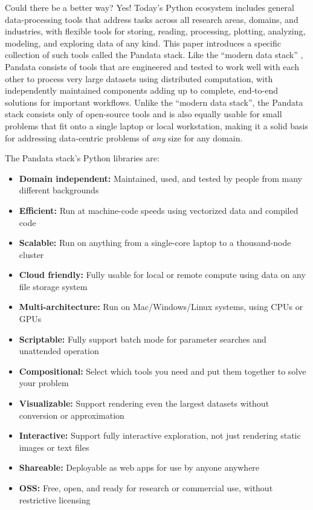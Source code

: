 Could there be a better way? Yes! Today's Python ecosystem includes general data-processing tools that address tasks across all research areas, domains, and industries, with flexible tools for storing, reading, processing, plotting, analyzing, modeling, and exploring data of any kind. This paper introduces a specific collection of such tools called the Pandata stack. Like the ``modern data stack'' \cite{handy:dbtb20,jaipuria:substack22}, Pandata consists of tools that are engineered and tested to work well with each other to process very large datasets using distributed computation, with independently maintained components adding up to complete, end-to-end solutions for important workflows. Unlike the ``modern data stack'', the Pandata stack consists only of open-source tools and is also equally usable for small problems that fit onto a single laptop or local workstation, making it a solid basis for addressing data-centric problems of \emph{any} size for any domain.

The Pandata stack's Python libraries are:

\begin{itemize}
  \item\textbf{Domain independent:} Maintained, used, and tested by people from many different backgrounds
  \item\textbf{Efficient:} Run at machine-code speeds using vectorized data and compiled code
  \item\textbf{Scalable:} Run on anything from a single-core laptop to a thousand-node cluster
  \item\textbf{Cloud friendly:} Fully usable for local or remote compute using data on any file storage system
  \item\textbf{Multi-architecture:} Run on Mac/Windows/Linux systems, using CPUs or GPUs
  \item\textbf{Scriptable:} Fully support batch mode for parameter searches and unattended operation
  \item\textbf{Compositional:} Select which tools you need and put them together to solve your problem
  \item\textbf{Visualizable:} Support rendering even the largest datasets without conversion or approximation
  \item\textbf{Interactive:} Support fully interactive exploration, not just rendering static images or text files
  \item\textbf{Shareable:} Deployable as web apps for use by anyone anywhere
  \item\textbf{OSS:} Free, open, and ready for research or commercial use, without restrictive licensing
\end{itemize}

